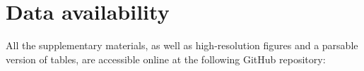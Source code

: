 
% 

{
\chapter*{Data availability}
\label{data_availability}
}

\normalsize
All the supplementary materials, as well as high-resolution figures and a parsable version of tables, are accessible online at the following GitHub repository:


% 
